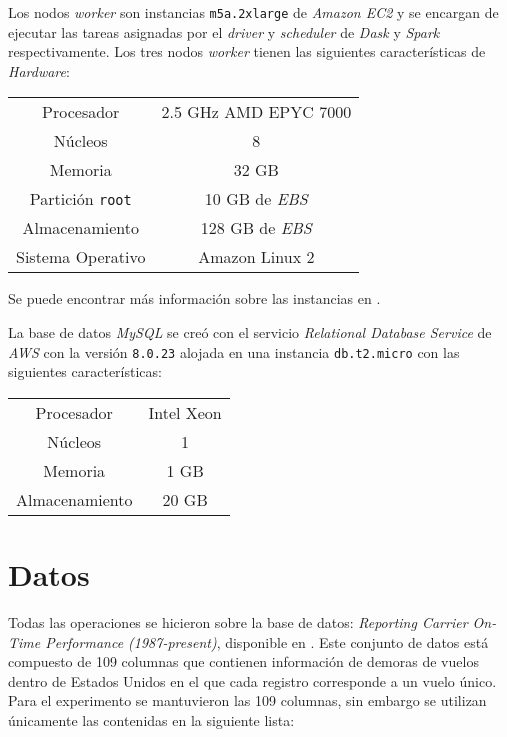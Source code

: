 Los nodos \textit{worker} son instancias \texttt{m5a.2xlarge}  de \textit{Amazon EC2} y se encargan de ejecutar las tareas asignadas por el \textit{driver} y \textit{scheduler} de \textit{Dask} y \textit{Spark} respectivamente. Los tres nodos \textit{worker} tienen las siguientes características de \textit{Hardware}:

\begin{center}
\begin{tabular}{|c|c|}
 \hline
  Procesador & 2.5 GHz AMD EPYC 7000 \\ 
  Núcleos & 8 \\
  Memoria & 32 GB \\ 
  Partición \texttt{root} & 10 GB de \textit{EBS}  \\
  Almacenamiento & 128 GB de \textit{EBS}  \\ 
  Sistema Operativo & Amazon Linux 2 \\
  \hline
\end{tabular}
\end{center}

Se puede encontrar más información sobre las instancias en \cite{ec2-instances}.

La base de datos \textit{MySQL} se creó con el servicio \textit{Relational Database Service} de \textit{AWS} con la versión \texttt{8.0.23} alojada en una instancia \texttt{db.t2.micro} con las siguientes características:

\begin{center}
\begin{tabular}{|c|c|}
 \hline
  Procesador & Intel Xeon \\ 
  Núcleos & 1 \\
  Memoria & 1 GB \\
  Almacenamiento & 20 GB  \\ 
  \hline
\end{tabular}
\end{center}

\section{Datos}

Todas las operaciones se hicieron sobre la base de datos: 
\textit{Reporting Carrier On-Time Performance (1987-present)}, disponible en \cite{linktranstat}. Este conjunto de datos está compuesto de 109 columnas que contienen información de demoras de vuelos dentro de Estados Unidos en el que cada registro corresponde a un vuelo único. Para el experimento se mantuvieron las 109 columnas, sin embargo se utilizan únicamente las contenidas en la siguiente lista:

